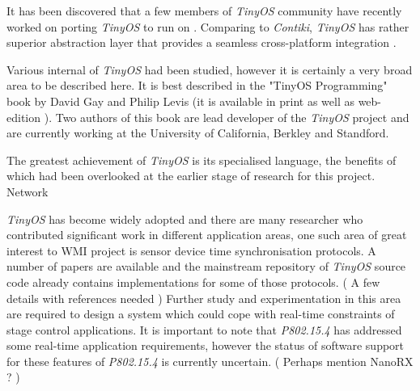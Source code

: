   It has been discovered that a few members of \emph{TinyOS} community
 have recently worked on porting \emph{TinyOS} to run on 
 \cite{tinyos:arch:rfa1-p1,tinyos:arch:rfa1-p2}. Comparing to \emph{Contiki},
 \emph{TinyOS} has rather superior abstraction layer that provides a seamless 
 cross-platform integration \cite{tinyos:tepXXX,tinyos:tepYYY,tinyos:tepZZZ}.
 
  Various internal of \emph{TinyOS} had been studied, however it is
 certainly a very broad area to be described here. It is best described
 in the "TinyOS Programming" book by David Gay and Philip Levis (it is
 available in print as well as web-edition \cite{tinyos:book}). Two
 authors of this book are lead developer of the \emph{TinyOS} project
 and are currently working at the University of California, Berkley
 and Standford.

  The greatest achievement of \emph{TinyOS} is its specialised language,
 the benefits of which had been overlooked at the earlier stage of research
 for this project. Network 

  \emph{TinyOS} has become widely adopted and there are many researcher
 who contributed significant work in different application areas, one
 such area of great interest to WMI project is sensor device time
 synchronisation protocols. A number of papers are available and the
 mainstream repository of \emph{TinyOS} source code already contains
 implementations for some of those protocols.
 ( A few details with references needed )
  Further study and experimentation in this area are required to design
 a system which could cope with real-time constraints of stage control
 applications. It is important to note that \emph{P802.15.4} has addressed
 some real-time application requirements, however the status of software
 support for these features of \emph{P802.15.4} is currently uncertain.
 ( Perhaps mention NanoRX ? )

 

